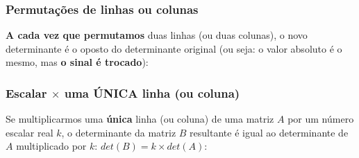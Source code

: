 \documentclass[pdftex, brazil]{beamer}
\begin{document}
\begin{frame}[t]
  \frametitle{Permutações de linhas ou colunas}
  \textbf{A cada vez que permutamos} duas linhas (ou duas colunas), o novo
  determinante é o oposto do determinante original (ou seja: o valor absoluto é
  o mesmo, mas \textbf{o sinal é trocado}):


\end{frame}

\begin{frame}[t]
  \frametitle{Escalar $\times$ uma ÚNICA linha (ou coluna)}
  Se multiplicarmos uma \textbf{única} linha (ou coluna) de uma matriz $A$ por
  um número escalar real $k$, o determinante da matriz $B$ resultante é igual ao
  determinante de $A$ multiplicado por $k$: $det(B) = k \times det(A)$:

\end{frame}
\end{document}
